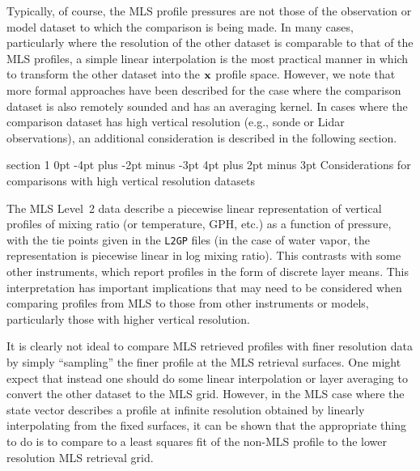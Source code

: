 \documentclass[11pt,draft]{report}
\makeatletter
\renewcommand{\section}{\@startsection%
  {section}%
  {1}%
  {0pt}%
  {-4pt plus -2pt minus -3pt}%
  {4pt plus 2pt minus 3pt}%
  {\Large\sffamily\fontseries{sb}\selectfont\flushleft\color{SectionColor}\figureversion{tabular}}}%
\makeatother
\begin{document}
Typically, of course, the MLS profile pressures are not those of the
observation or model dataset to which the comparison is being made.  In
many cases, particularly where the resolution of the other dataset is
comparable to that of the MLS profiles, a simple linear interpolation is
the most practical manner in which to transform the other dataset into
the $\mathbf{x}$ profile space.  However, we note that more formal approaches
have been described \citep{RodgersAndConnor03} for the case where the
comparison dataset is also remotely sounded and has an averaging kernel.
In cases where the comparison dataset has high vertical resolution
(e.g., sonde or Lidar observations), an additional consideration is
described in the following section.

\section{Considerations for comparisons with high vertical resolution
  datasets}
\label{sec:BasisIssues}

The MLS Level~2 data describe a piecewise linear representation of
vertical profiles of mixing ratio (or temperature, GPH, etc.) as a function of
pressure, with the tie points given in the \texttt{L2GP} files (in the
case of water vapor, the representation is piecewise linear in log
mixing ratio).  This contrasts with some other instruments, which report
profiles in the form of discrete layer means.  This interpretation has
important implications that may need to be considered when comparing
profiles from MLS to those from other instruments or models,
particularly those with higher vertical resolution.

It is clearly not ideal to compare MLS retrieved profiles with finer
resolution data by simply ``sampling'' the finer profile at the MLS
retrieval surfaces.  One might expect that instead one should do some
linear interpolation or layer averaging to convert the other dataset to
the MLS grid.  However, in the MLS case where the state vector describes
a profile at infinite resolution obtained by linearly interpolating from
the fixed surfaces, it can be shown that the appropriate thing to do is
to compare to a least squares fit of the non-MLS profile to the lower
resolution MLS retrieval grid.
\end{document}
